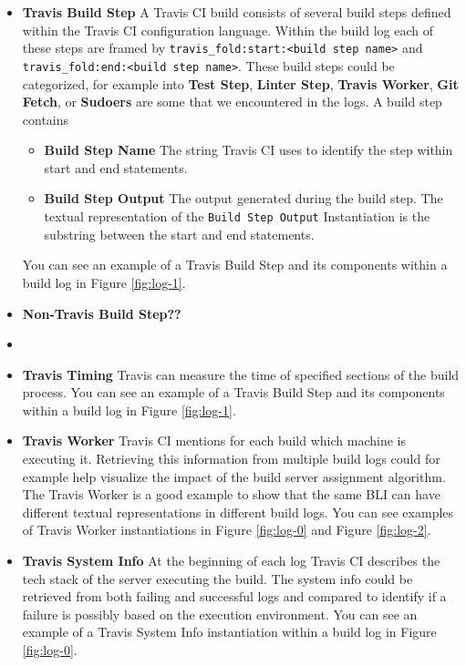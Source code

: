 \documentclass[\myrootdir/main.tex]{subfiles}
\begin{document}
\begin{itemize}
	\item \textbf{Travis Build Step} A Travis CI build consists of several build steps defined within the Travis CI configuration language. Within the build log each of these steps are framed by \lstinline{travis_fold:start:<build step name>} and \\ \lstinline{travis_fold:end:<build step name>}.
	These build steps could be categorized, for example into \textbf{Test Step}, \textbf{Linter Step}, \textbf{Travis Worker}, \textbf{Git Fetch}, or \textbf{Sudoers} are some that we encountered in the logs.
	A build step contains
	\begin{itemize}
		\item \textbf{Build Step Name} The string Travis CI uses to identify the step within start and end statements.
		\item \textbf{Build Step Output} The output generated during the build step. The textual representation of the \texttt{Build Step Output} Instantiation is the substring between the start and end statements.
	\end{itemize}
	You can see an example of a Travis Build Step and its components within a build log in Figure \ref{fig:log-1}.

	\item \textbf{Non-Travis Build Step??}
	\item 
	\item \textbf{Travis Timing} Travis can measure the time of specified sections of the build process.
	You can see an example of a Travis Build Step and its components within a build log in Figure \ref{fig:log-1}.

	\item \textbf{Travis Worker} Travis CI mentions for each build which machine is executing it.
	Retrieving this information from multiple build logs could for example help visualize the impact of the build server assignment algorithm.
	The Travis Worker is a good example to show that the same BLI can have different textual representations in different build logs.
	You can see examples of Travis Worker instantiations in Figure \ref{fig:log-0} and Figure \ref{fig:log-2}.

	\item \textbf{Travis System Info} At the beginning of each log Travis CI describes the tech stack of the server executing the build.
	The system info could be retrieved from both failing and successful logs and compared to identify if a failure is possibly based on the execution environment.
	You can see an example of a Travis System Info instantiation within a build log in Figure \ref{fig:log-0}.


\end{itemize}
\end{document}
